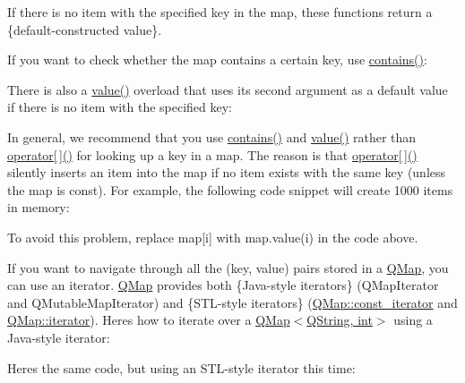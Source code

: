 \begin{DoxyCodeInclude}
\end{DoxyCodeInclude}
 If there is no item with the specified key in the map, these functions return a \{default-\/constructed value\}.

If you want to check whether the map contains a certain key, use \hyperlink{class_q_map_ac92f0cafb70425a2d3d5171cf367dd11}{contains()}\+:


\begin{DoxyCodeInclude}
\end{DoxyCodeInclude}
 There is also a \hyperlink{class_q_map_ab9c04f61f4abd94439d4431118a238e5}{value()} overload that uses its second argument as a default value if there is no item with the specified key\+:


\begin{DoxyCodeInclude}
\end{DoxyCodeInclude}
 In general, we recommend that you use \hyperlink{class_q_map_ac92f0cafb70425a2d3d5171cf367dd11}{contains()} and \hyperlink{class_q_map_ab9c04f61f4abd94439d4431118a238e5}{value()} rather than \hyperlink{class_q_map_a69dc3a1b9dde2e59e829a7baa9761bc7}{operator\mbox{[}$\,$\mbox{]}()} for looking up a key in a map. The reason is that \hyperlink{class_q_map_a69dc3a1b9dde2e59e829a7baa9761bc7}{operator\mbox{[}$\,$\mbox{]}()} silently inserts an item into the map if no item exists with the same key (unless the map is const). For example, the following code snippet will create 1000 items in memory\+:


\begin{DoxyCodeInclude}
\end{DoxyCodeInclude}
 To avoid this problem, replace {\ttfamily map}\mbox{[}i\mbox{]} with {\ttfamily map.\+value(i)} in the code above.

If you want to navigate through all the (key, value) pairs stored in a \hyperlink{class_q_map}{Q\+Map}, you can use an iterator. \hyperlink{class_q_map}{Q\+Map} provides both \{Java-\/style iterators\} (Q\+Map\+Iterator and Q\+Mutable\+Map\+Iterator) and \{S\+T\+L-\/style iterators\} (\hyperlink{class_q_map_1_1const__iterator}{Q\+Map\+::const\+\_\+iterator} and \hyperlink{class_q_map_1_1iterator}{Q\+Map\+::iterator}). Here\textquotesingle{}s how to iterate over a \hyperlink{class_q_map}{Q\+Map$<$\+Q\+String, int$>$} using a Java-\/style iterator\+:


\begin{DoxyCodeInclude}
\end{DoxyCodeInclude}
 Here\textquotesingle{}s the same code, but using an S\+T\+L-\/style iterator this time\+:


